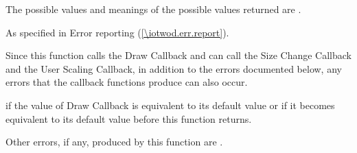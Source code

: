\begin{itemdescr}
\pnum
\returns
The possible values and meanings of the possible values returned are .

\pnum
\throws
As specified in Error reporting (\ref{\iotwod.err.report}).

\pnum
\remarks
Since this function calls the Draw Callback and can call the Size Change Callback and the User Scaling Callback, in addition to the errors documented below, any errors that the callback functions produce can also occur.

\pnum
\errors
\pnum
{} if the value of Draw Callback is equivalent to its default value or if it becomes equivalent to its default value before this function returns.

\pnum
Other errors, if any, produced by this function are .
\end{itemdescr}

